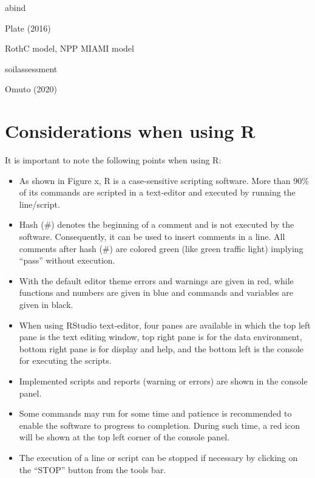 \documentclass[
  10pt,
  b5paper,
]{book}
\providecommand{\tightlist}{%
  \setlength{\itemsep}{0pt}\setlength{\parskip}{0pt}}
\begin{document}
abind

Plate (2016)

RothC model, NPP MIAMI model

soilassessment

Omuto (2020)

\hypertarget{considerations-when-using-r}{%
\section{Considerations when using R}\label{considerations-when-using-r}}

It is important to note the following points when using R:

\begin{itemize}
\tightlist
\item
  As shown in Figure x, R is a case-sensitive scripting software. More than 90\% of its commands are scripted in a text-editor and executed by running the line/script.
\item
  Hash (\#) denotes the beginning of a comment and is not executed by the software. Consequently, it can be used to insert comments in a line. All comments after hash (\#) are colored green (like green traffic light) implying ``pass'' without execution.
\item
  With the default editor theme errors and warnings are given in red, while functions and numbers are given in blue and commands and variables are given in black.
\item
  When using RStudio text-editor, four panes are available in which the top left pane is the text editing window, top right pane is for the data environment, bottom right pane is for display and help, and the bottom left is the console for executing the scripts.
\item
  Implemented scripts and reports (warning or errors) are shown in the console panel.
\item
  Some commands may run for some time and patience is recommended to enable the software to progress to completion. During such time, a red icon will be shown at the top left corner of the console panel.
\item
  The execution of a line or script can be stopped if necessary by clicking on the ``STOP'' button from the tools bar.
\end{itemize}
\end{document}

